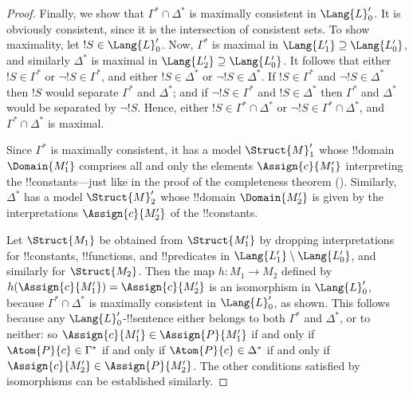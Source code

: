 \documentclass[../../../include/open-logic-section]{subfiles}
\begin{document}
\begin{proof}
Finally, we show that $\Gamma^* \cap \Delta^*$ is maximally consistent
in $\Lang{L}'_0$. It is obviously consistent, since it is the
intersection of consistent sets. To show maximality, let $!S \in
\Lang{L}'_0$. Now, $\Gamma^*$ is maximal in $\Lang{L'_1}
\supseteq \Lang{L'_0}$, and similarly $\Delta^*$ is maximal in
$\Lang{L'_2} \supseteq \Lang{L'_0}$. It follows that either
$!S \in \Gamma^*$ or $\lnot !S \in \Gamma^*$, and either
$!S \in \Delta^*$ or $\lnot !S \in \Delta^*$. If $!S \in
\Gamma^*$ and $\lnot !S \in \Delta^*$ then $!S$ would
separate $\Gamma^*$ and $\Delta^*$; and if $\lnot !S \in
\Gamma^*$ and $!S \in \Delta^*$ then $\Gamma^*$ and $\Delta^*$
would be separated by $\lnot !S$. Hence, either $!S \in
\Gamma^* \cap \Delta^*$ or $\lnot !S \in \Gamma^* \cap \Delta^*$,
and $\Gamma^* \cap \Delta^*$ is maximal. 

Since $\Gamma^*$ is maximally consistent, it has a model
$\Struct{M}'_1$ whose !!{domain} $\Domain{M'_1}$ comprises all and
only the elements $\Assign{c}{M'_1}$ interpreting the
!!{constant}s---just like in the proof of the completeness theorem
(). Similarly, $\Delta^*$ has a
model $\Struct{M}'_2$ whose !!{domain} $\Domain{M'_2}$ is given by the
interpretations $\Assign{c}{M'_2}$ of the !!{constant}s.

Let $\Struct{M_1}$ be obtained from $\Struct{M'_1}$ by dropping
interpretations for !!{constant}s, !!{function}s, and !!{predicate}s in
$\Lang{L'_1} \setminus \Lang{L'_0}$, and similarly for
$\Struct{M_2}$. Then the map $h \colon M_1 \to M_2$ defined by
$h(\Assign{c}{M'_1}) = \Assign{c}{M'_2}$ is an
isomorphism in $\Lang{L}'_0$, because $\Gamma^* \cap \Delta^*$ is
maximally consistent in $\Lang{L}'_0$, as shown. This follows
because any $\Lang{L}'_0$-!!{sentence} either belongs to both
$\Gamma^*$ and $\Delta^*$, or to neither: so $\Assign{c}{M'_1} \in
\Assign{P}{M'_1}$ if and only if $\Atom{P}{c} \in \Gamma^*$ if and only if
$\Atom{P}{c} \in \Delta^*$ if and only if $\Assign{c}{M'_2} \in
\Assign{P}{M'_2}$. The other conditions satisfied by isomorphisms
can be established similarly.


\end{proof}
\end{document}
